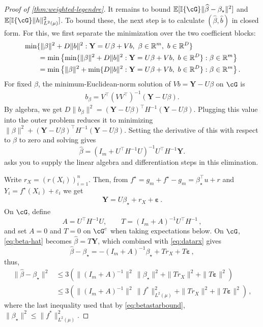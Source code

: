 \documentclass[11pt,twoside]{article}
\newcommand{\E}{\mathbb E}
\newcommand{\I}{\mathbb I}
\newcommand{\one}[1]{\I\{#1\}}
\newcommand{\R}{\mathbb R}
\theoremstyle{definition}
\theoremstyle{remark}
\begin{document}
\begin{proof}[Proof of \cref{thm:weighted-legendre}]
It remains to bound $\E[ \one{\cG}\|\widehat\beta-\beta_\star\|^2]$ and $\E[\one{\cG}\|h\|_{L^2(\mu)}^2]$.
To bound these, the next step is to calculate $(\widehat \beta,\widehat b)$ in closed form.
For this, we first separate the minimization over the two
coefficient blocks:
\begin{align*}
\MoveEqLeft
\min\{\|\beta\|^2+D\|b\|^2:
       \mathbf Y=U\beta+Vb,\ \beta\in\R^m,\ b\in\R^D\}\\
&=\min\left\{
   \min\{\|\beta\|^2+D\|b\|^2:
          \mathbf Y=U\beta+Vb,\ b\in\R^D\}:
   \beta\in\R^m\right\}\\
&=\min\left\{
   \|\beta\|^2+
   \min\{D\|b\|^2:
          \mathbf Y=U\beta+Vb,\ b\in\R^D\}:
   \beta\in\R^m\right\}.
\end{align*}
For fixed $\beta$, the minimum-Euclidean-norm solution of
$Vb=\mathbf Y-U\beta$ on $\cG$ is
\begin{align}
 b_\beta=V^\top(VV^\top)^{-1}(\mathbf Y-U\beta).  
 \label{eq:bbeta}
\end{align}
By algebra, we get
$ D\|b_\beta\|^2
 =(\mathbf Y-U\beta)^\top H^{-1}(\mathbf Y-U\beta)$.
Plugging this value into the outer problem reduces it to minimizing
$\|\beta\|^2
 +(\mathbf Y-U\beta)^\top H^{-1}(\mathbf Y-U\beta)$.
Setting the derivative of this with respect to $\beta$ to zero and solving gives
\begin{equation}
 \widehat\beta=(I_m+U^\top H^{-1}U)^{-1}
 U^\top H^{-1}\mathbf Y.
 \label{eq:beta-hat}
\end{equation}
 asks you to supply the linear algebra and
differentiation steps in this elimination.

Write $r_X=(r(X_i))_{i=1}^n$. Then, 
from $f^\star = g_m + f^\star-g_m = \beta_\star^\top u + r$
and $Y_i = f^\star(X_i)+\varepsilon_i$
we get
\begin{align}
  \mathbf Y=U\beta_\star+r_X+\boldsymbol\varepsilon\,.
  \label{eq:datarx}
\end{align}
On $\cG$, define
\[
 A=U^\top H^{-1}U,
 \qquad T=(I_m+A)^{-1}U^\top H^{-1}\,,
\]
and set $A=0$ and $T=0$ on $\cG^c$ when taking expectations below. On $\cG$,
\cref{eq:beta-hat}
 becomes $\widehat \beta = T \mathbf Y$, which combined with  \cref{eq:datarx}
 gives
\begin{equation}
 \widehat\beta-\beta_\star
 =-(I_m+A)^{-1}\beta_\star+Tr_X+T\boldsymbol\varepsilon\,,
 \label{eq:beta-error}
\end{equation}
thus,
\begin{align*}
\|\widehat\beta-\beta_\star\|^2
& \le 
 3( \|(I_m+A)^{-1}\|^2 \, \| \beta_\star\|^2+\|Tr_X\|^2+\|T\boldsymbol\varepsilon\|^2)\\
&\le
 3( \|(I_m+A)^{-1}\|^2 \, \| f^*\|_{L^2(\mu)}^2+\|T r_X\|^2+\|T \boldsymbol\varepsilon\|^2)\,,
\end{align*}
where the last inequality used that by
\cref{eq:betastarbound}, $\| \beta_\star\|^2\le \| f^*\|_{L^2(\mu)}^2$.


\end{proof}
\end{document}
